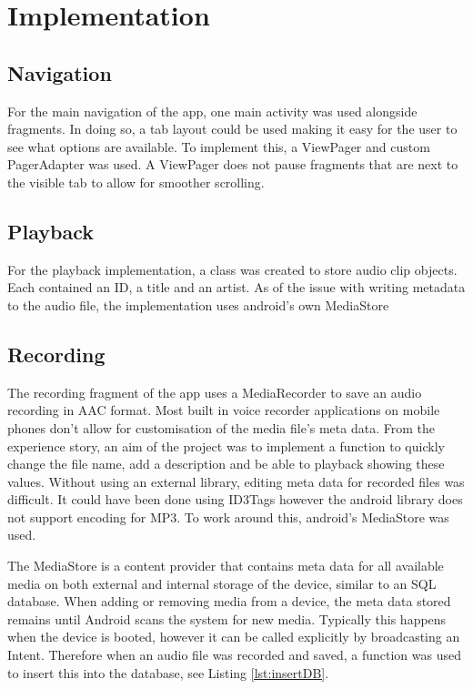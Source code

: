 \documentclass[conference]{acmsiggraph}
\begin{document}
\section{Implementation}

\subsection{Navigation}

For the main navigation of the app, one main activity was used alongside fragments. In doing so, a tab layout could be used making it easy for the user to see what options are available. To implement this, a ViewPager and custom PagerAdapter was used. A ViewPager does not pause fragments that are next to the visible tab to allow for smoother scrolling.

\subsection{Playback}

For the playback implementation, a class was created to store audio clip objects. Each contained an ID, a title and an artist. As of the issue with writing metadata to the audio file, the implementation uses android's own MediaStore  %

\subsection{Recording}

The recording fragment of the app uses a MediaRecorder to save an audio recording in AAC format. Most built in voice recorder applications on mobile phones don't allow for customisation of the media file's meta data. From the experience story, an aim of the project was to implement a function to quickly change the file name, add a description and be able to playback showing these values. Without using an external library, editing meta data for recorded files was difficult. It could have been done using ID3Tags however the android library does not support encoding for MP3. \cite{SupportedMedia} To work around this, android's MediaStore was used.

The MediaStore is a content provider that contains meta data for all available media on both external and internal storage of the device, similar to an SQL database. When adding or removing media from a device, the meta data stored remains until Android scans the system for new media. Typically this happens when the device is booted, however it can be called explicitly by broadcasting an Intent. \cite{MediaStore} Therefore when an audio file was recorded and saved, a function was used to insert this into the database, see Listing \ref{lst:insertDB}.
\end{document}
